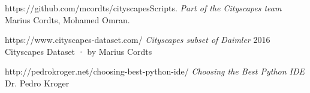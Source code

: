 \documentclass[10pt,draftclsnofoot,onecolumn,journal,compsoc]{IEEEtran}
\begin{document}
\newpage



\begin{thebibliography}{12}

 https://github.com/mcordts/cityscapesScripts.
\textit{Part of the Cityscapes team} Marius Cordts, Mohamed Omran.

 https://www.cityscapes-dataset.com/
\textit{Cityscapes subset of Daimler} 2016 Cityscapes Dataset · by Marius Cordts 

 http://pedrokroger.net/choosing-best-python-ide/
\textit{Choosing the Best Python IDE} Dr. Pedro Kroger

\end{thebibliography}
        
\end{document}
